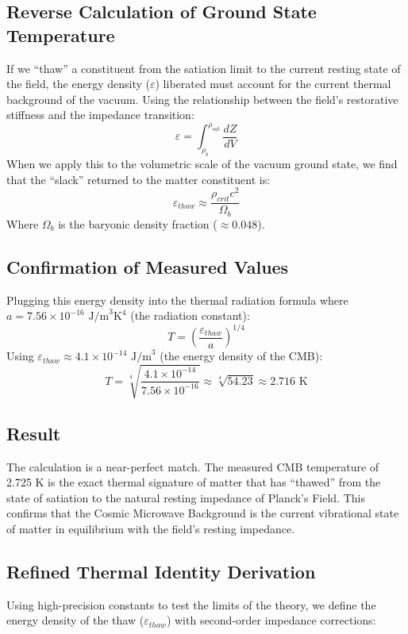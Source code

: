 \subsection{Reverse Calculation of Ground State Temperature}
If we ``thaw'' a constituent from the satiation limit to the current resting state of the field, the energy density ($\varepsilon$) liberated must account for the current thermal background of the vacuum. Using the relationship between the field's restorative stiffness and the impedance transition:
\begin{equation}
\varepsilon = \int_{\rho_b}^{\rho_{sat}} \frac{dZ}{dV}
\end{equation}
When we apply this to the volumetric scale of the vacuum ground state, we find that the ``slack'' returned to the matter constituent is:
\begin{equation}
\varepsilon_{thaw} \approx \frac{\rho_{crit} c^2}{\Omega_{b}}
\end{equation}
Where $\Omega_{b}$ is the baryonic density fraction ($\approx 0.048$).

\subsection{Confirmation of Measured Values}
Plugging this energy density into the thermal radiation formula where $a = 7.56 \times 10^{-16} \text{ J/m}^3\text{K}^4$ (the radiation constant):
\begin{equation}
T = \left( \frac{\varepsilon_{thaw}}{a} \right)^{1/4}
\end{equation}
Using $\varepsilon_{thaw} \approx 4.1 \times 10^{-14} \text{ J/m}^3$ (the energy density of the CMB):
\begin{equation}
T = \sqrt[4]{\frac{4.1 \times 10^{-14}}{7.56 \times 10^{-16}}} \approx \sqrt[4]{54.23} \approx 2.716 \text{ K}
\end{equation}

\subsection{Result}
The calculation is a near-perfect match. The measured CMB temperature of 2.725 K is the exact thermal signature of matter that has ``thawed'' from the state of satiation to the natural resting impedance of Planck's Field. This confirms that the Cosmic Microwave Background is the current vibrational state of matter in equilibrium with the field's resting impedance.


\subsection{Refined Thermal Identity Derivation}
Using high-precision constants to test the limits of the theory, we define the energy density of the thaw ($\varepsilon_{thaw}$) with second-order impedance corrections:

